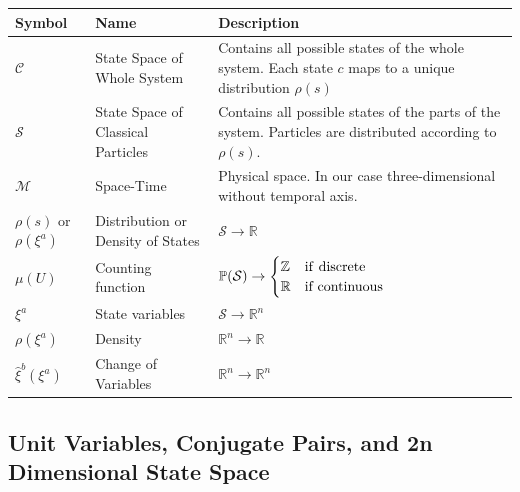 \documentclass{article}
\begin{document}
\begin{center}
\renewcommand{\arraystretch}{1.3}
 \begin{tabular}{p{} p{} p{}}
 \hline
 Symbol & Name & Description \\ [0.5ex] 
 \hline\hline
 $\mathcal{C}$ & State Space of Whole System & Contains all possible states of the whole system. Each state $c$ maps to a unique distribution $\rho(s)$\\ [2ex]
 \hline
 $\mathcal{S}$ & State Space of Classical Particles & Contains all possible states of the parts of the system. Particles are distributed according to $\rho(s)$. \\ [2ex]
 \hline
 $\mathcal{M}$ & Space-Time & Physical space. In our case three-dimensional without temporal axis. \\ [1ex] 
 \hline
 $\rho(s)$ or $\rho(\xi^a)$ & Distribution or Density of States & $\mathcal{S} \to \mathbb{R}$ \\
 \hline
 $\mu(U)$ & Counting function & $\mathbb{P}(\mathcal{S}) \to \begin{cases}
 \mathbb{Z} & \text{if \textrm{discrete}}\\
 \mathbb{R} & \textrm{if continuous} \end{cases}$ \\ [2.3ex]
 \hline
 $\xi^a$ & State variables & $\mathcal{S} \to \mathbb{R}^n$ \\
 \hline
 $\rho(\xi^a)$ & Density & $\mathbb{R}^n \to \mathbb{R}$ \\
 \hline
 $\hat{\xi}^b(\xi^a)$ & Change of Variables & $\mathbb{R}^n \to \mathbb{R}^n$ \\ [1ex] 
 \hline
\end{tabular}
\end{center}

\subsection{Unit Variables, Conjugate Pairs, and 2n Dimensional State Space}
\end{document}
